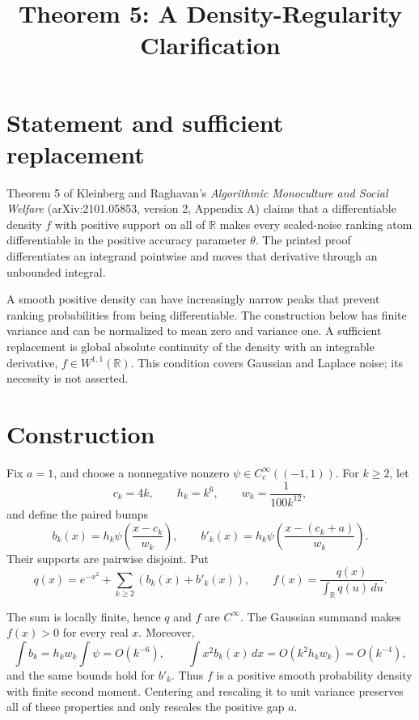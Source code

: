 \documentclass[11pt]{article}
\title{Theorem 5: A Density-Regularity Clarification}
\author{}
\date{}
\begin{document}
\maketitle

\section*{Statement and sufficient replacement}

Theorem 5 of Kleinberg and Raghavan's \emph{Algorithmic Monoculture and Social
Welfare} (arXiv:2101.05853, version 2, Appendix A)
claims that a differentiable density $f$ with positive support on all of
$\mathbb R$ makes every scaled-noise ranking atom differentiable in the
positive accuracy parameter $\theta$.  The printed proof differentiates an
integrand pointwise and moves that derivative through an unbounded integral.

A smooth positive density can have increasingly narrow peaks that prevent
ranking probabilities from being differentiable. The construction below has
finite variance and can be normalized to mean zero and variance one. A
sufficient replacement is global absolute continuity of the density with
an integrable derivative, $f\in W^{1,1}(\mathbb R)$. This condition covers
Gaussian and Laplace noise; its necessity is not asserted.

\section*{Construction}

Fix $a=1$, and choose a nonnegative nonzero
$\psi\in C_c^\infty((-1,1))$.  For $k\geq 2$, let
\[
  c_k=4k,\qquad h_k=k^6,\qquad w_k=\frac{1}{100k^{12}},
\]
and define the paired bumps
\[
  b_k(x)=h_k\psi\left(\frac{x-c_k}{w_k}\right),\qquad
  b'_k(x)=h_k\psi\left(\frac{x-(c_k+a)}{w_k}\right).
\]
Their supports are pairwise disjoint. Put
\[
  q(x)=e^{-x^2}+\sum_{k\geq2}(b_k(x)+b'_k(x)),
  \qquad f(x)=\frac{q(x)}{\int_{\mathbb R}q(u)\,du}.
\]

The sum is locally finite, hence $q$ and $f$ are $C^\infty$.  The Gaussian
summand makes $f(x)>0$ for every real $x$.  Moreover,
\[
  \int b_k = h_kw_k\int\psi=O(k^{-6}),
  \qquad
  \int x^2b_k(x)\,dx=O(k^2h_kw_k)=O(k^{-4}),
\]
and the same bounds hold for $b'_k$.  Thus $f$ is a positive smooth probability
density with finite second moment.  Centering and rescaling it to unit variance
preserves all of these properties and only rescales the positive gap $a$.
\end{document}
